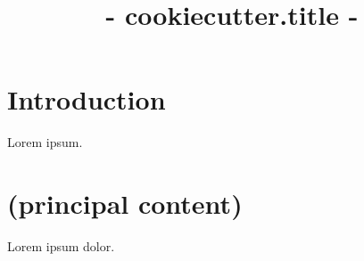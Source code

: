 \documentclass[TN]{spherex}
\title{ {{- cookiecutter.title -}} }
\begin{document}
\maketitle

\begin{dochistory}
\end{dochistory}


\section{Introduction}

Lorem ipsum.

\section{(principal content)}

Lorem ipsum dolor. \cite{SPHEREx_SPIE}


\end{document}
